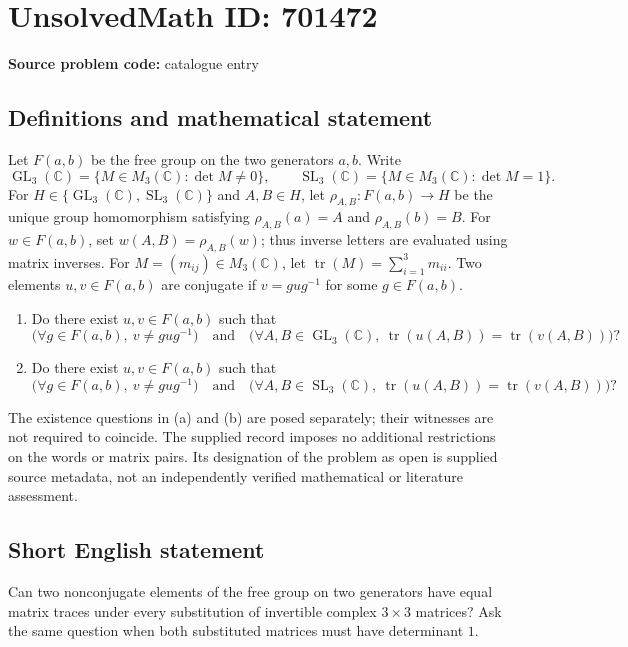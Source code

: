 \documentclass[11pt]{article}
\newcommand{\C}{\mathbb{C}}
\begin{document}
\section*{UnsolvedMath ID: 701472}
\textbf{Source problem code:} catalogue entry
\subsection{Definitions and mathematical statement}
Let \(F(a,b)\) be the free group on the two generators \(a,b\). Write
\[
\operatorname{GL}_3(\C)=\{M\in M_3(\C):\det M\ne 0\},\qquad
\operatorname{SL}_3(\C)=\{M\in M_3(\C):\det M=1\}.
\]
For \(H\in\{\operatorname{GL}_3(\C),\operatorname{SL}_3(\C)\}\) and \(A,B\in H\), let \(\rho_{A,B}:F(a,b)\to H\) be the unique group homomorphism satisfying \(\rho_{A,B}(a)=A\) and \(\rho_{A,B}(b)=B\). For \(w\in F(a,b)\), set \(w(A,B)=\rho_{A,B}(w)\); thus inverse letters are evaluated using matrix inverses. For \(M=(m_{ij})\in M_3(\C)\), let \(\operatorname{tr}(M)=\sum_{i=1}^{3}m_{ii}\). Two elements \(u,v\in F(a,b)\) are conjugate if \(v=gug^{-1}\) for some \(g\in F(a,b)\).

\begin{enumerate}
\item[(a)] Do there exist \(u,v\in F(a,b)\) such that
\[
\bigl(\forall g\in F(a,b),\ v\ne gug^{-1}\bigr)
\quad\text{and}\quad
\bigl(\forall A,B\in\operatorname{GL}_3(\C),\
\operatorname{tr}(u(A,B))=\operatorname{tr}(v(A,B))\bigr)?
\]
\item[(b)] Do there exist \(u,v\in F(a,b)\) such that
\[
\bigl(\forall g\in F(a,b),\ v\ne gug^{-1}\bigr)
\quad\text{and}\quad
\bigl(\forall A,B\in\operatorname{SL}_3(\C),\
\operatorname{tr}(u(A,B))=\operatorname{tr}(v(A,B))\bigr)?
\]
\end{enumerate}
The existence questions in (a) and (b) are posed separately; their witnesses are not required to coincide. The supplied record imposes no additional restrictions on the words or matrix pairs. Its designation of the problem as open is supplied source metadata, not an independently verified mathematical or literature assessment.
\subsection{Short English statement}
Can two nonconjugate elements of the free group on two generators have equal matrix traces under every substitution of invertible complex \(3\times3\) matrices? Ask the same question when both substituted matrices must have determinant \(1\).
\end{document}
